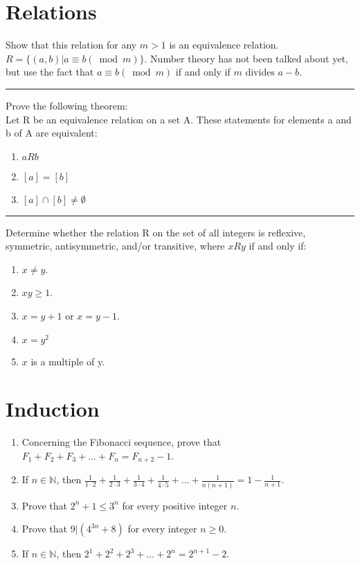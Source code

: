 \documentclass{article}
\begin{document}
    \section{Relations}
	    Show that this relation for any $m > 1$ is an equivalence relation. \\
    $R = \{(a, b) \lvert a \equiv b (\bmod m)\}$. Number theory has not been talked about yet, but use the fact that $a \equiv b (\bmod m)$ if and only if $m$ divides $a - b$.
    \vspace{5 pt}
    \hrule
    \vspace{5 pt}
    Prove the following theorem: \\
    Let R be an equivalence relation on a set A. These statements for elements a and b of A are equivalent: \\
    \begin{enumerate}
        \item $aRb$
        \item $[a] = [b]$
        \item $[a] \cap [b] \neq \emptyset$
    \end{enumerate}
    \vspace{5 pt}
    \hrule
    \vspace{5 pt}
    Determine whether the relation R on the set of all integers is reflexive, symmetric, antisymmetric, and/or transitive, where $xRy$ if and only if:
    \begin{enumerate}
        \item $x \neq y$.
        \item $xy \geq 1$.
        \item $x = y + 1$ or $x = y - 1$.
        \item $x = y^2$
        \item $x$ is a multiple of y.
    \end{enumerate}
    \section{Induction}
	\begin{enumerate}
	\item Concerning the Fibonacci sequence, prove that $F_{1} + F_{2} + F_{3} + ... + F_{n} = F_{n + 2} - 1$.
	\item If $n \in \mathbb{N}$, then $\frac{1}{1\cdot 2} + \frac{1}{2\cdot 3} + \frac{1}{3\cdot 4} + \frac{1}{4\cdot 5} + ... + \frac{1}{n(n+1)} = 1 - \frac{1}{n + 1}$.
	\item Prove that $2^{n} + 1 \le 3^{n}$ for every positive integer $n$.
	\item Prove that $9\lvert (4^{3n} + 8)$ for every integer $n \ge 0$.
	\item If $n \in \mathbb{N}$, then $2^{1} + 2^{2} + 2^{3} + ... + 2^{n} = 2^{n + 1} - 2$.
	\end{enumerate}	
\end{document}
